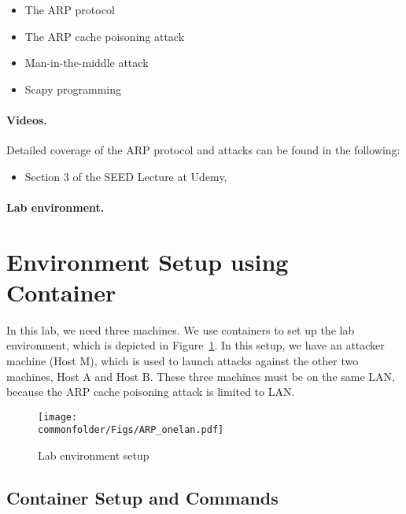 \begin{itemize}[noitemsep]
\item The ARP protocol
\item The ARP cache poisoning attack
\item Man-in-the-middle attack
\item Scapy programming
\end{itemize}
 


\paragraph{Videos.}
Detailed coverage of the ARP protocol and attacks can be found in the following:

\begin{itemize}
\item Section 3 of the SEED Lecture at Udemy, \seedisvideo
\end{itemize}


\paragraph{Lab environment.} \seedenvironmentB




\section{Environment Setup using Container}

In this lab, we need three machines. We use 
containers to set up the lab environment, which is depicted 
in Figure~\ref{arp:fig:labsetup}.
In this setup, we have an attacker machine (Host M),
which is used to launch attacks against the other two machines, Host A and
Host B.  These three machines must be on the same LAN,
because the ARP cache poisoning attack is limited to LAN.

\begin{figure}[htb]
\begin{center}
\texttt{[image: \\commonfolder/Figs/ARP\_onelan.pdf]}
\end{center}
\caption{Lab environment setup}
\label{arp:fig:labsetup}
\end{figure}
 

\subsection{Container Setup and Commands}

